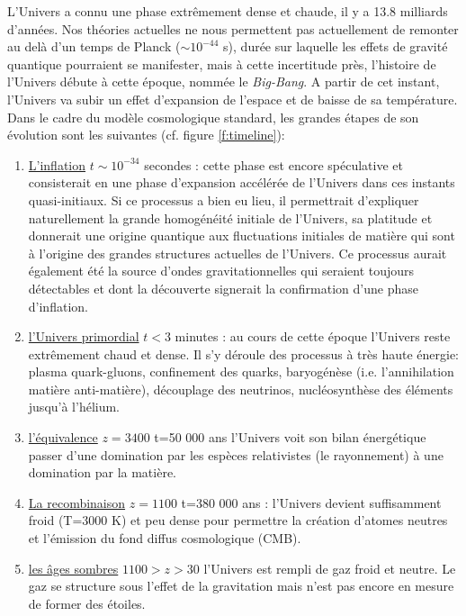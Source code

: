 L'Univers a connu une phase extrêmement dense et chaude, il y a 13.8 milliards d'années. Nos théories actuelles ne nous permettent pas actuellement de remonter au delà d'un temps de Planck ($\sim 10^{-44}$ s), durée sur laquelle les effets de gravité quantique pourraient se manifester, mais à cette incertitude près, l'histoire de l'Univers débute à cette époque, nommée le \textit{Big-Bang}. A partir de cet instant, l'Univers va subir un effet d'expansion de l'espace et de baisse de sa température. Dans le cadre du modèle cosmologique standard, les grandes étapes de son évolution sont les suivantes (cf. figure \ref{f:timeline}):
\begin{enumerate}
\item \underline{L'inflation} $t\sim 10^{-34}$ secondes :  cette phase est encore spéculative et consisterait en une phase d'expansion accélérée de l'Univers dans ces instants quasi-initiaux. Si ce processus a bien eu lieu, il permettrait d'expliquer naturellement la grande homogénéité initiale de l'Univers, sa platitude et donnerait une origine quantique aux fluctuations initiales de matière qui sont à l'origine des grandes structures actuelles de l'Univers. Ce processus aurait également été la source d'ondes gravitationnelles qui seraient toujours détectables et dont la découverte signerait la confirmation d'une phase d'inflation.
\item \underline{l'Univers primordial} $t<3$ minutes : au cours de cette époque l'Univers reste extrêmement chaud et dense. Il s'y déroule des processus à très haute énergie: plasma quark-gluons, confinement des quarks, baryogénèse (i.e. l'annihilation matière anti-matière), découplage des neutrinos, nucléosynthèse des éléments jusqu'à l'hélium.
\item \underline{l'équivalence} $z=3400$ t=50 000 ans  l'Univers voit son bilan énergétique passer d'une domination par les espèces relativistes (le rayonnement) à une domination par la matière.
\item \underline{La recombinaison} $z=1100$ t=380 000 ans : l'Univers devient suffisamment froid (T=3000 K) et peu dense pour permettre la création d'atomes neutres et l'émission du fond diffus cosmologique (CMB). 
\item \underline{les âges sombres} $1100>z>30$  l'Univers est rempli de gaz froid et neutre. Le gaz se structure sous l'effet de la gravitation mais  n'est pas encore en mesure de former des étoiles. 

\end{enumerate}
